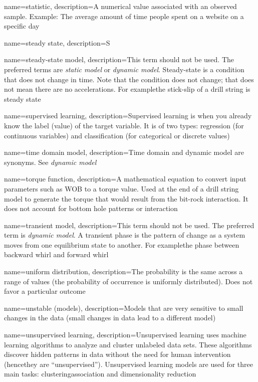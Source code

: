 {
	name=statistic,
	description={A numerical value associated with an observed sample.  Example: The average amount of time people spent on a website on a specific day}
}

{
	name=steady state,
	description=S
}

{
	name=steady-state model,
	description=This term should not be used.  The preferred terms are \textit{static model} or \textit{dynamic model}.  Steady-state is a condition that does not change in time.  Note that the condition does not change; that does not mean there are no accelerations.  For example\comma the stick-slip of a drill string is steady state
}

{
    name=supervised learning,
    description=Supervised learning is when you already know the label (value) of the target variable.  It is of two types: regression (for continuous variables) and classification (for categorical or discrete values)
}

{
	name=time domain model,
	description=Time domain and dynamic model are synonyms.  See \emph{dynamic model}
}

{
	name=torque function,
	description=A mathematical equation to convert input parameters such as WOB to a torque value.  Used at the end of a drill string model to generate the torque that would result from the bit-rock interaction.  It does not account for bottom hole patterns or interaction
}

{
	name=transient model,
	description=This term should not be used.  The preferred term is \textit{dynamic model}.  A transient phase is the pattern of change as a system moves from one equilibrium state to another.  For example\comma the phase between backward whirl and forward whirl
}

{
	name=uniform distribution,
	description=The probability is the same across a range of values (the probability of occurrence is uniformly distributed).  Does not favor a particular outcome
}

{
    name=unstable (models),
    description=Models that are very sensitive to small changes in the data (small changes in data lead to a different model)
}

{
    name=unsupervised learning,
	description=Unsupervised learning uses machine learning algorithms to analyze and cluster unlabeled data sets.  These algorithms discover hidden patterns in data without the need for human intervention (hence\comma they are ``unsupervised'').  Unsupervised learning models are used for three main tasks: clustering\comma association and dimensionality reduction
}